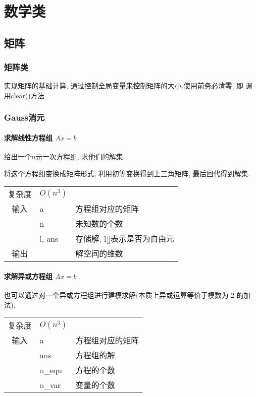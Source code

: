 \chapter{数学类}
\section{矩阵}


    \subsection{矩阵类}\small
实现矩阵的基础计算, 通过控制全局变量来控制矩阵的大小.使用前务必清零, 即
调用clear()方法



    \subsection{Gauss消元}\small
        \subsubsection{求解线性方程组 $Ax = b$}\small
给出一个n元一次方程组, 求他们的解集.

将这个方程组变换成矩阵形式, 利用初等变换得到上三角矩阵, 最后回代得到解集.
\begin{longtable}{|c|l|l|}
复杂度 & $O(n^3)$ & \\
输入 & a & 方程组对应的矩阵 \\
 & n & 未知数的个数 \\
 & l, ans & 存储解, l[]表示是否为自由元 \\
输出 & & 解空间的维数 \\
\end{longtable}


        \subsubsection{求解异或方程组 $Ax = b$}\small
也可以通过对一个异或方程组进行建模求解(本质上异或运算等价于模数为 2 的加法).
\begin{longtable}{|c|l|l|}
复杂度 & $O(n^3)$ & \\
输入 & a & 方程组对应的矩阵 \\
 & ans & 方程组的解 \\
 & n\_equ & 方程的个数 \\
 & n\_var & 变量的个数 \\
\end{longtable}


